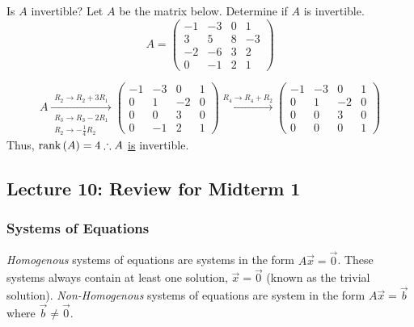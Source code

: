\begin{example}{Is $A$ invertible?}{}
    Let $A$ be the matrix below. Determine if $A$ is invertible.
    \[
        A = \begin{pmatrix}
            -1 & -3 & 0 & 1 \\
            3 & 5 & 8 & -3 \\
            -2 & -6 & 3 & 2 \\
            0 & -1 & 2 & 1 
        \end{pmatrix} 
    \]
    \begin{solution}
        \[
            A \xrightarrow[\substack{R_3 \to R_3 - 2R_1 \\ R_2 \to -\frac{1}{4}R_2}]{R_2 \to R_2 + 3R_1}
            \begin{pmatrix}
                -1 & -3 & 0 & 1 \\
                0 & 1 & -2 & 0 \\
                0 & 0 & 3 & 0 \\
                0 & -1 & 2 & 1 
            \end{pmatrix}
            \xrightarrow{R_4 \to R_4 + R_2}
            \begin{pmatrix}
                -1 & -3 & 0 & 1 \\
                0 & 1 & -2 & 0 \\
                0 & 0 & 3 & 0 \\
                0 & 0 & 0 & 1 
            \end{pmatrix}
        \]
        Thus, $\text{rank}\left(A\right)=4 \therefore A$ \underline{is} invertible.
    \end{solution}
\end{example}

\subsection{Lecture 10: Review for Midterm 1}
\subsubsection*{Systems of Equations}
\textit{Homogenous} systems of equations are systems in the form $A\vec{x}=\vec{0}$. These systems always contain at least one solution, $\vec{x} = \vec{0}$ (known as the trivial solution). \textit{Non-Homogenous} systems of equations are system in the form $A\vec{x}=\vec{b}$ where $\vec{b} \ne \vec{0}$.


